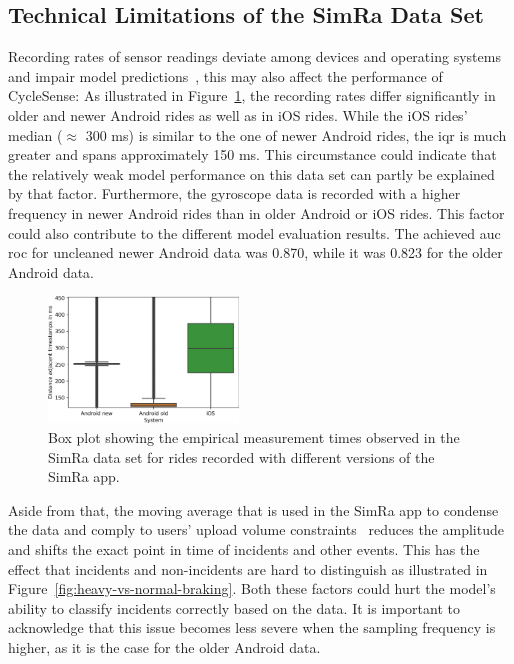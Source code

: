 \subsection{Technical Limitations of the SimRa Data Set}
\label{subsec:technical_limitations_of_the_simra_data_set}
Recording rates of sensor readings deviate among devices and operating systems and impair model predictions~\cite{stisen2015smart}, this may also affect the performance of CycleSense:
As illustrated in Figure~\ref{fig:emp-measurements}, the recording rates differ significantly in older and newer Android rides as well as in iOS rides.
While the iOS rides' median ($\approx$ 300 ms) is similar to the one of newer Android rides, the \ac{iqr} is much greater and spans approximately 150 ms.
This circumstance could indicate that the relatively weak model performance on this data set can partly be explained by that factor. 
Furthermore, the gyroscope data is recorded with a higher frequency in newer Android rides than in older Android or iOS rides.
This factor could also contribute to the different model evaluation results. 
The achieved \ac{auc} \ac{roc} for uncleaned newer Android data was 0.870, while it was 0.823 for the older Android data.

\begin{figure}[t]
	\centering
	\includegraphics[width=0.45\textwidth]{fig/empirical_measurements.png}
	\caption{Box plot showing the empirical measurement times observed in the SimRa data set for rides recorded with different versions of the SimRa app.}
	\label{fig:emp-measurements}
\end{figure}

Aside from that, the moving average that is used in the SimRa app to condense the data and comply to users' upload volume constraints~\cite{karakaya2020simra} reduces the amplitude and shifts the exact point in time of incidents and other events.
This has the effect that incidents and non-incidents are hard to distinguish as illustrated in Figure~\ref{fig:heavy-vs-normal-braking}.
Both these factors could hurt the model's ability to classify incidents correctly based on the data.
It is important to acknowledge that this issue becomes less severe when the sampling frequency is higher, as it is the case for the older Android data.

